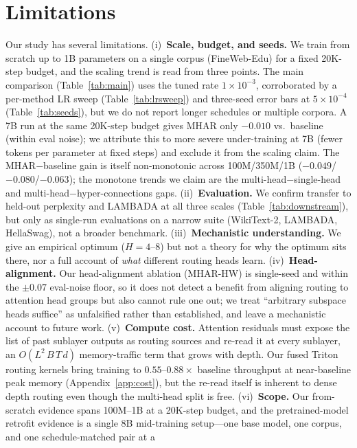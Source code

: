 \documentclass{article}
\begin{document}
\section{Limitations}
\label{sec:limitations}
Our study has several limitations. (i)~\textbf{Scale, budget, and seeds.} We train
from scratch up to 1B parameters on a single corpus (FineWeb-Edu) for a fixed
20K-step budget, and the scaling trend is read from three points. The main comparison
(Table~\ref{tab:main}) uses the tuned rate $1\times10^{-3}$, corroborated by a
per-method LR sweep (Table~\ref{tab:lrsweep}) and three-seed error bars at
$5\times10^{-4}$ (Table~\ref{tab:seeds}), but we do not report longer schedules or
multiple corpora. A 7B run at the same 20K-step budget gives MHAR only $-0.010$ vs.\
baseline (within eval noise); we attribute this to more severe under-training at 7B
(fewer tokens per parameter at fixed steps) and exclude it from the scaling claim.
The MHAR$-$baseline gain is itself non-monotonic across 100M/350M/1B
($-0.049$/$-0.080$/$-0.063$); the monotone trends we claim are the
multi-head$-$single-head and multi-head$-$hyper-connections gaps. (ii)~\textbf{Evaluation.} We confirm transfer to held-out perplexity
and LAMBADA at all three scales (Table~\ref{tab:downstream}), but only as single-run
evaluations on a narrow suite (WikiText-2, LAMBADA, HellaSwag), not a broader benchmark. (iii)~\textbf{Mechanistic understanding.} We give an
empirical optimum ($H{=}4$--$8$) but not a theory for why the optimum sits there,
nor a full account of \emph{what} different routing heads learn. (iv)~\textbf{Head-alignment.}
Our head-alignment ablation (MHAR-HW) is single-seed and within the $\pm0.07$
eval-noise floor, so it does not detect a benefit from aligning routing to attention
head groups but also cannot rule one out; we treat ``arbitrary subspace heads
suffice'' as unfalsified rather than established, and leave a mechanistic account to
future work. (v)~\textbf{Compute cost.} Attention residuals must expose the list
of past sublayer outputs as routing sources and re-read it at every sublayer, an
$O(L^2\,B\,T\,d)$ memory-traffic term that grows with depth. Our fused Triton routing
kernels bring training to $0.55$--$0.88\times$ baseline throughput at near-baseline
peak memory (Appendix~\ref{app:cost}), but the re-read itself is inherent to dense
depth routing even though the multi-head split is free. (vi)~\textbf{Scope.} Our from-scratch evidence spans 100M--1B at a 20K-step
budget, and the pretrained-model retrofit evidence is a single 8B mid-training
setup---one base model, one corpus, and one schedule-matched pair at a
\end{document}
